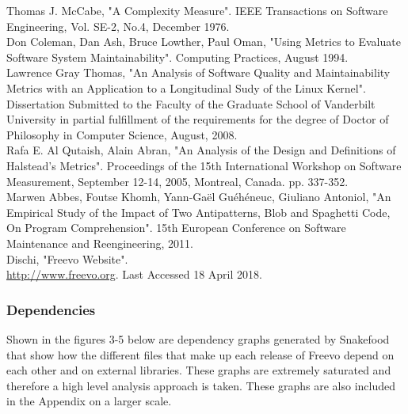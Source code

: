 \documentclass[10.5pt,journal, a4paper]{IEEEtran}
\begin{document}
\begin{thebibliography}{5}


  
 Thomas J. McCabe, "A Complexity Measure". IEEE Transactions on Software Engineering, Vol. SE-2, No.4, December 1976. \\


 Don Coleman, Dan Ash, Bruce Lowther, Paul Oman, "Using Metrics to Evaluate Software System Maintainability". Computing Practices, August 1994. \\




 Lawrence Gray Thomas, "An Analysis of Software Quality and Maintainability Metrics with an Application to a Longitudinal Sudy of the Linux Kernel". Dissertation Submitted to the Faculty of the Graduate School of Vanderbilt University in partial fulfillment of the requirements for the degree of
Doctor of Philosophy in Computer Science, August, 2008.\\




 Rafa E. Al Qutaish, Alain Abran, "An Analysis of the Design and Definitions of Halstead’s Metrics". Proceedings of the 15th International Workshop on Software Measurement, September 12-14, 2005, Montreal, Canada. pp. 337-352. \\

 Marwen Abbes, Foutse Khomh, Yann-Gaël Guéhéneuc, Giuliano Antoniol, "An Empirical Study of the Impact of Two Antipatterns, Blob and Spaghetti Code, On Program Comprehension". 15th European Conference on Software Maintenance and Reengineering, 2011. \\

 Dischi, "Freevo Website".\\
 \url{http://www.freevo.org}.
Last Accessed 18 April 2018. 


\end{thebibliography}

\onecolumn
\appendix


\subsubsection{Dependencies}
\noindent
Shown in the figures 3-5 below are dependency graphs generated by Snakefood that show how the different files that make up each release of Freevo depend on each other and on external libraries. These graphs are extremely saturated and therefore a high level analysis approach is taken. These graphs are also included in the Appendix on a larger scale. 
\end{document}
